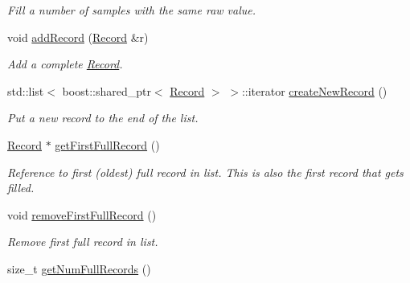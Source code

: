\begin{DoxyCompactItemize}
\begin{DoxyCompactList}\small\item\em Fill a number of samples with the same raw value. \item\end{DoxyCompactList}\item 
void \hyperlink{classgdf_1_1_record_buffer_a97e676d68f9aa9441c301c78b46f0a4d}{addRecord} (\hyperlink{classgdf_1_1_record}{Record} \&r)
\begin{DoxyCompactList}\small\item\em Add a complete \hyperlink{classgdf_1_1_record}{Record}. \item\end{DoxyCompactList}\item 
\hypertarget{classgdf_1_1_record_buffer_a21f20828bffa27e1ed7383eacde6a927}{
std::list$<$ boost::shared\_\-ptr$<$ \hyperlink{classgdf_1_1_record}{Record} $>$ $>$::iterator \hyperlink{classgdf_1_1_record_buffer_a21f20828bffa27e1ed7383eacde6a927}{createNewRecord} ()}
\label{classgdf_1_1_record_buffer_a21f20828bffa27e1ed7383eacde6a927}

\begin{DoxyCompactList}\small\item\em Put a new record to the end of the list. \item\end{DoxyCompactList}\item 
\hypertarget{classgdf_1_1_record_buffer_ab4f141c5c15a7c92be005758ef8231e2}{
\hyperlink{classgdf_1_1_record}{Record} $\ast$ \hyperlink{classgdf_1_1_record_buffer_ab4f141c5c15a7c92be005758ef8231e2}{getFirstFullRecord} ()}
\label{classgdf_1_1_record_buffer_ab4f141c5c15a7c92be005758ef8231e2}

\begin{DoxyCompactList}\small\item\em Reference to first (oldest) full record in list. This is also the first record that gets filled. \item\end{DoxyCompactList}\item 
\hypertarget{classgdf_1_1_record_buffer_aea0c7b33b23e3f4d97cc2398d27e740b}{
void \hyperlink{classgdf_1_1_record_buffer_aea0c7b33b23e3f4d97cc2398d27e740b}{removeFirstFullRecord} ()}
\label{classgdf_1_1_record_buffer_aea0c7b33b23e3f4d97cc2398d27e740b}

\begin{DoxyCompactList}\small\item\em Remove first full record in list. \item\end{DoxyCompactList}\item 
\hypertarget{classgdf_1_1_record_buffer_a3573e58d036d703a5862d859e9f7395c}{
size\_\-t \hyperlink{classgdf_1_1_record_buffer_a3573e58d036d703a5862d859e9f7395c}{getNumFullRecords} ()}
\label{classgdf_1_1_record_buffer_a3573e58d036d703a5862d859e9f7395c}


\end{DoxyCompactItemize}
